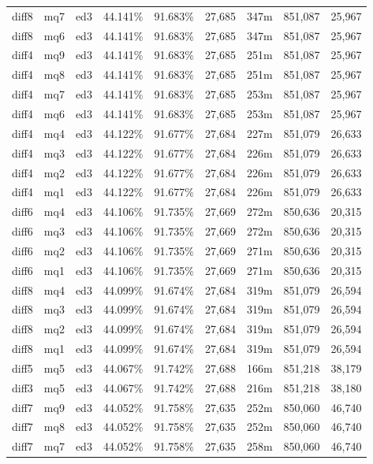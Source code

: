 \begin{landscape}
\begin{longtable}{|c|c|c||c|c||c|c|c|c|}
diff8 & mq7 & ed3 & 44.141\% & 91.683\% & 27,685 & 347m & 851,087 & 25,967 \\
diff8 & mq6 & ed3 & 44.141\% & 91.683\% & 27,685 & 347m & 851,087 & 25,967 \\
diff4 & mq9 & ed3 & 44.141\% & 91.683\% & 27,685 & 251m & 851,087 & 25,967 \\
diff4 & mq8 & ed3 & 44.141\% & 91.683\% & 27,685 & 251m & 851,087 & 25,967 \\
diff4 & mq7 & ed3 & 44.141\% & 91.683\% & 27,685 & 253m & 851,087 & 25,967 \\
diff4 & mq6 & ed3 & 44.141\% & 91.683\% & 27,685 & 253m & 851,087 & 25,967 \\
diff4 & mq4 & ed3 & 44.122\% & 91.677\% & 27,684 & 227m & 851,079 & 26,633 \\
diff4 & mq3 & ed3 & 44.122\% & 91.677\% & 27,684 & 226m & 851,079 & 26,633 \\
diff4 & mq2 & ed3 & 44.122\% & 91.677\% & 27,684 & 226m & 851,079 & 26,633 \\
diff4 & mq1 & ed3 & 44.122\% & 91.677\% & 27,684 & 226m & 851,079 & 26,633 \\
diff6 & mq4 & ed3 & 44.106\% & 91.735\% & 27,669 & 272m & 850,636 & 20,315 \\
diff6 & mq3 & ed3 & 44.106\% & 91.735\% & 27,669 & 272m & 850,636 & 20,315 \\
diff6 & mq2 & ed3 & 44.106\% & 91.735\% & 27,669 & 271m & 850,636 & 20,315 \\
diff6 & mq1 & ed3 & 44.106\% & 91.735\% & 27,669 & 271m & 850,636 & 20,315 \\
diff8 & mq4 & ed3 & 44.099\% & 91.674\% & 27,684 & 319m & 851,079 & 26,594 \\
diff8 & mq3 & ed3 & 44.099\% & 91.674\% & 27,684 & 319m & 851,079 & 26,594 \\
diff8 & mq2 & ed3 & 44.099\% & 91.674\% & 27,684 & 319m & 851,079 & 26,594 \\
diff8 & mq1 & ed3 & 44.099\% & 91.674\% & 27,684 & 319m & 851,079 & 26,594 \\
diff5 & mq5 & ed3 & 44.067\% & 91.742\% & 27,688 & 166m & 851,218 & 38,179 \\
diff3 & mq5 & ed3 & 44.067\% & 91.742\% & 27,688 & 216m & 851,218 & 38,180 \\
diff7 & mq9 & ed3 & 44.052\% & 91.758\% & 27,635 & 252m & 850,060 & 46,740 \\
diff7 & mq8 & ed3 & 44.052\% & 91.758\% & 27,635 & 252m & 850,060 & 46,740 \\
diff7 & mq7 & ed3 & 44.052\% & 91.758\% & 27,635 & 258m & 850,060 & 46,740 \\

\end{longtable}
\end{landscape}
